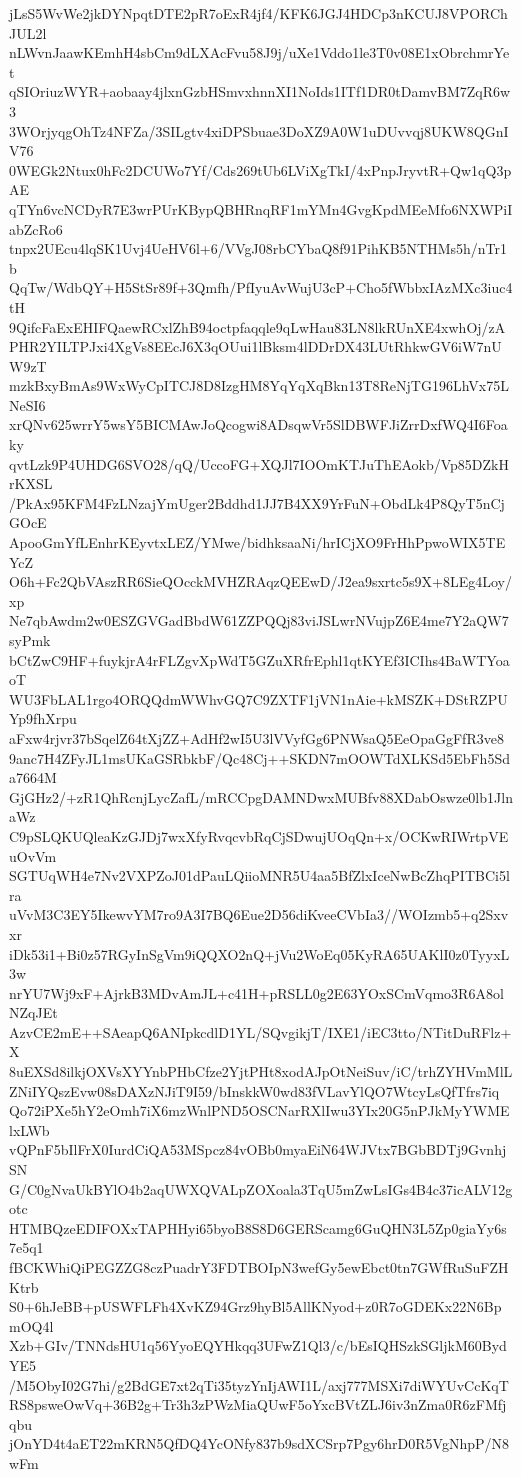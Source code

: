 jLsS5WvWe2jkDYNpqtDTE2pR7oExR4jf4/KFK6JGJ4HDCp3nKCUJ8VPORChJUL2l
nLWvnJaawKEmhH4sbCm9dLXAcFvu58J9j/uXe1Vddo1le3T0v08E1xObrchmrYet
qSIOriuzWYR+aobaay4jlxnGzbHSmvxhnnXI1NoIds1ITf1DR0tDamvBM7ZqR6w3
3WOrjyqgOhTz4NFZa/3SILgtv4xiDPSbuae3DoXZ9A0W1uDUvvqj8UKW8QGnIV76
0WEGk2Ntux0hFc2DCUWo7Yf/Cds269tUb6LViXgTkI/4xPnpJryvtR+Qw1qQ3pAE
qTYn6vcNCDyR7E3wrPUrKBypQBHRnqRF1mYMn4GvgKpdMEeMfo6NXWPiIabZcRo6
tnpx2UEcu4lqSK1Uvj4UeHV6l+6/VVgJ08rbCYbaQ8f91PihKB5NTHMs5h/nTr1b
QqTw/WdbQY+H5StSr89f+3Qmfh/PfIyuAvWujU3cP+Cho5fWbbxIAzMXc3iuc4tH
9QifcFaExEHIFQaewRCxlZhB94octpfaqqle9qLwHau83LN8lkRUnXE4xwhOj/zA
PHR2YILTPJxi4XgVs8EEcJ6X3qOUui1lBksm4lDDrDX43LUtRhkwGV6iW7nUW9zT
mzkBxyBmAs9WxWyCpITCJ8D8IzgHM8YqYqXqBkn13T8ReNjTG196LhVx75LNeSI6
xrQNv625wrrY5wsY5BICMAwJoQcogwi8ADsqwVr5SlDBWFJiZrrDxfWQ4I6Foaky
qvtLzk9P4UHDG6SVO28/qQ/UccoFG+XQJl7IOOmKTJuThEAokb/Vp85DZkHrKXSL
/PkAx95KFM4FzLNzajYmUger2Bddhd1JJ7B4XX9YrFuN+ObdLk4P8QyT5nCjGOcE
ApooGmYfLEnhrKEyvtxLEZ/YMwe/bidhksaaNi/hrICjXO9FrHhPpwoWIX5TEYcZ
O6h+Fc2QbVAszRR6SieQOcckMVHZRAqzQEEwD/J2ea9sxrtc5s9X+8LEg4Loy/xp
Ne7qbAwdm2w0ESZGVGadBbdW61ZZPQQj83viJSLwrNVujpZ6E4me7Y2aQW7syPmk
bCtZwC9HF+fuykjrA4rFLZgvXpWdT5GZuXRfrEphl1qtKYEf3ICIhs4BaWTYoaoT
WU3FbLAL1rgo4ORQQdmWWhvGQ7C9ZXTF1jVN1nAie+kMSZK+DStRZPUYp9fhXrpu
aFxw4rjvr37bSqelZ64tXjZZ+AdHf2wI5U3lVVyfGg6PNWsaQ5EeOpaGgFfR3ve8
9anc7H4ZFyJL1msUKaGSRbkbF/Qc48Cj++SKDN7mOOWTdXLKSd5EbFh5Sda7664M
GjGHz2/+zR1QhRcnjLycZafL/mRCCpgDAMNDwxMUBfv88XDabOswze0lb1JlnaWz
C9pSLQKUQleaKzGJDj7wxXfyRvqcvbRqCjSDwujUOqQn+x/OCKwRIWrtpVEuOvVm
SGTUqWH4e7Nv2VXPZoJ01dPauLQiioMNR5U4aa5BfZlxIceNwBcZhqPITBCi5lra
uVvM3C3EY5IkewvYM7ro9A3I7BQ6Eue2D56diKveeCVbIa3//WOIzmb5+q2Sxvxr
iDk53i1+Bi0z57RGyInSgVm9iQQXO2nQ+jVu2WoEq05KyRA65UAKlI0z0TyyxL3w
nrYU7Wj9xF+AjrkB3MDvAmJL+c41H+pRSLL0g2E63YOxSCmVqmo3R6A8olNZqJEt
AzvCE2mE++SAeapQ6ANIpkcdlD1YL/SQvgikjT/IXE1/iEC3tto/NTitDuRFlz+X
8uEXSd8ilkjOXVsXYYnbPHbCfze2YjtPHt8xodAJpOtNeiSuv/iC/trhZYHVmMlL
ZNiIYQszEvw08sDAXzNJiT9I59/bInskkW0wd83fVLavYlQO7WtcyLsQfTfrs7iq
Qo72iPXe5hY2eOmh7iX6mzWnlPND5OSCNarRXlIwu3YIx20G5nPJkMyYWMElxLWb
vQPnF5bIlFrX0IurdCiQA53MSpcz84vOBb0myaEiN64WJVtx7BGbBDTj9GvnhjSN
G/C0gNvaUkBYlO4b2aqUWXQVALpZOXoala3TqU5mZwLsIGs4B4c37icALV12gotc
HTMBQzeEDIFOXxTAPHHyi65byoB8S8D6GERScamg6GuQHN3L5Zp0giaYy6s7e5q1
fBCKWhiQiPEGZZG8czPuadrY3FDTBOIpN3wefGy5ewEbct0tn7GWfRuSuFZHKtrb
S0+6hJeBB+pUSWFLFh4XvKZ94Grz9hyBl5AllKNyod+z0R7oGDEKx22N6BpmOQ4l
Xzb+GIv/TNNdsHU1q56YyoEQYHkqq3UFwZ1Ql3/c/bEsIQHSzkSGljkM60BydYE5
/M5ObyI02G7hi/g2BdGE7xt2qTi35tyzYnIjAWI1L/axj777MSXi7diWYUvCcKqT
RS8psweOwVq+36B2g+Tr3h3zPWzMiaQUwF5oYxcBVtZLJ6iv3nZma0R6zFMfjqbu
jOnYD4t4aET22mKRN5QfDQ4YcONfy837b9sdXCSrp7Pgy6hrD0R5VgNhpP/N8wFm
